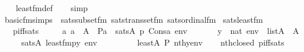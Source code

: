 \begin{isabellebody}
%
\isadelimproof
\ \ %
\endisadelimproof
%
\isatagproof
{}\isamarkupfalse%
\ least{\isacharunderscore}{\kern0pt}fm{\isacharunderscore}{\kern0pt}def\isanewline
\ \ \isamarkupfalse%
\ simp%
\endisatagproof
{\isafoldproof}%
%
\isadelimproof
\isanewline
%
\endisadelimproof
\isanewline
\isanewline
{}\isamarkupfalse%
\ basic{\isacharunderscore}{\kern0pt}fm{\isacharunderscore}{\kern0pt}simps\ {\isacharequal}{\kern0pt}\ sats{\isacharunderscore}{\kern0pt}subset{\isacharunderscore}{\kern0pt}fm{\isacharprime}{\kern0pt}\ sats{\isacharunderscore}{\kern0pt}transset{\isacharunderscore}{\kern0pt}fm{\isacharprime}{\kern0pt}\ sats{\isacharunderscore}{\kern0pt}ordinal{\isacharunderscore}{\kern0pt}fm{\isacharprime}{\kern0pt}\isanewline
\isanewline
{}\isamarkupfalse%
\ sats{\isacharunderscore}{\kern0pt}least{\isacharunderscore}{\kern0pt}fm\ {\isacharcolon}{\kern0pt}\isanewline
\ \ \ p{\isacharunderscore}{\kern0pt}iff{\isacharunderscore}{\kern0pt}sats{\isacharcolon}{\kern0pt}\ \isanewline
\ \ \ \ {\isachardoublequoteopen}{\isasymAnd}a{\isachardot}{\kern0pt}\ a\ {\isasymin}\ A\ {\isasymLongrightarrow}\ P{\isacharparenleft}{\kern0pt}a{\isacharparenright}{\kern0pt}\ {\isasymlongleftrightarrow}\ sats{\isacharparenleft}{\kern0pt}A{\isacharcomma}{\kern0pt}\ p{\isacharcomma}{\kern0pt}\ Cons{\isacharparenleft}{\kern0pt}a{\isacharcomma}{\kern0pt}\ env{\isacharparenright}{\kern0pt}{\isacharparenright}{\kern0pt}{\isachardoublequoteclose}\isanewline
\ \ \isanewline
\ \ \ \ {\isachardoublequoteopen}{\isasymlbrakk}y\ {\isasymin}\ nat{\isacharsemicolon}{\kern0pt}\ env\ {\isasymin}\ list{\isacharparenleft}{\kern0pt}A{\isacharparenright}{\kern0pt}\ {\isacharsemicolon}{\kern0pt}\ {}{\isasymin}A{\isasymrbrakk}\isanewline
\ \ \ \ {\isasymLongrightarrow}\ sats{\isacharparenleft}{\kern0pt}A{\isacharcomma}{\kern0pt}\ least{\isacharunderscore}{\kern0pt}fm{\isacharparenleft}{\kern0pt}p{\isacharcomma}{\kern0pt}y{\isacharparenright}{\kern0pt}{\isacharcomma}{\kern0pt}\ env{\isacharparenright}{\kern0pt}\ {\isasymlongleftrightarrow}\isanewline
\ \ \ \ \ \ \ \ least{\isacharparenleft}{\kern0pt}{\isacharhash}{\kern0pt}{\isacharhash}{\kern0pt}A{\isacharcomma}{\kern0pt}\ P{\isacharcomma}{\kern0pt}\ nth{\isacharparenleft}{\kern0pt}y{\isacharcomma}{\kern0pt}env{\isacharparenright}{\kern0pt}{\isacharparenright}{\kern0pt}{\isachardoublequoteclose}\isanewline
%
\isadelimproof
\ \ %
\endisadelimproof
%
\isatagproof
{}\isamarkupfalse%
\ nth{\isacharunderscore}{\kern0pt}closed\ p{\isacharunderscore}{\kern0pt}iff{\isacharunderscore}{\kern0pt}sats\ \isamarkupfalse%

\end{isabellebody}

